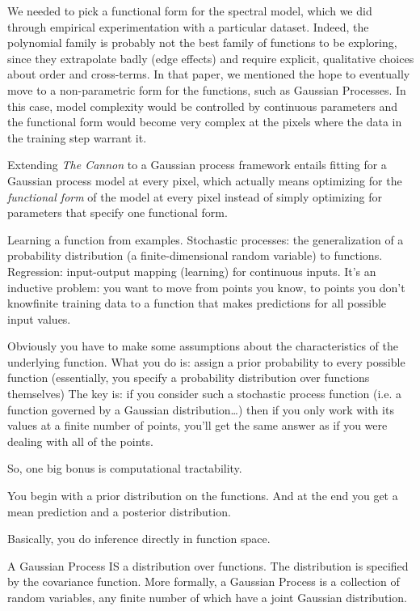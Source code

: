 \documentclass[12pt, preprint]{aastex}
\begin{document}
We needed to pick a functional form for the spectral model, which we did
through empirical experimentation with a particular dataset. Indeed, the
polynomial family is probably not the best family of functions to be 
exploring, since they extrapolate badly (edge effects) and require explicit, 
qualitative choices about order and cross-terms. In that paper, we mentioned 
the hope to eventually move to a non-parametric form for the functions, such 
as Gaussian Processes. In this case, model complexity would be controlled by 
continuous parameters and the functional form would become very complex at 
the pixels where the data in the training step warrant it.

Extending \emph{The Cannon} to a Gaussian process framework entails fitting 
for a Gaussian process model at every pixel, which actually means optimizing 
for the \emph{functional form} of the model at every pixel instead of simply 
optimizing for parameters that specify one functional form.

Learning a function from examples. Stochastic processes: the generalization 
of a probability distribution (a finite-dimensional random variable) to 
functions. Regression: input-output mapping (learning) for continuous inputs. 
It's an inductive problem: you want to move from points you know, to points 
you don't know\ldotsfrom finite training data to a function that makes 
predictions for all possible input values.

Obviously you have to make some assumptions about the characteristics of the 
underlying function. What you do is: assign a prior probability to every 
possible function (essentially, you specify a probability distribution over 
functions themselves) The key is: if you consider such a stochastic process 
function (i.e. a function governed by a Gaussian distribution\ldots) then if 
you only work with its values at a finite number of points, you'll get the 
same answer as if you were dealing with all of the points.

So, one big bonus is computational tractability.

You begin with a prior distribution on the functions. And at the end you get 
a mean prediction and a posterior distribution.

Basically, you do inference directly in function space.

A Gaussian Process IS a distribution over functions. The distribution is 
specified by the covariance function. More formally, a Gaussian Process 
is a collection of random variables, any finite number of which have a 
joint Gaussian distribution.
\end{document}
